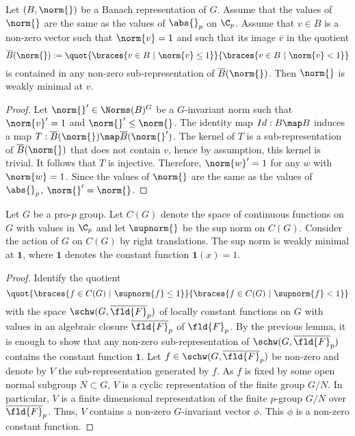 \begin{lem}
Let $(B,\norm{})$ be a Banach representation of $G$.
Assume that the values of $\norm{}$ are the same as the values of $\abs{}_p$ on $\C_p$.
Assume that $v\in B$ is a non-zero vector such that $\norm{v}=1$ and such that its image $\overline{v}$ in the quotient 
\[\overline{B}(\norm{}):=\quot{\braces{v\in B\ |\ \norm{v}\leq 1}}{\braces{v\in B\ |\ \norm{v}< 1}}\]
is contained in any non-zero sub-representation of $\overline{B}(\norm{})$.
Then $\norm{}$ is weakly minimal at $v$.
\end{lem} 
	\begin{proof}
    Let $\norm{}'\in \Norms(B)^G$ be a $G$-invariant norm such that $\norm{v}'=1$ and $\norm{}'\leq \norm{}$.
    The identity map $Id:B\map B$ induces a map $T:\overline{B}(\norm{})\map \overline{B}(\norm{}')$.
    The kernel of $T$ is a sub-representation of $\overline{B}(\norm{})$ that does not contain $v$, hence by assumption, this kernel is trivial.
    It follows that $T$ is injective.
    Therefore, $\norm{w}'=1$ for any $w$ with $\norm{w}=1$.
    Since the values of $\norm{}$ are the same as the values of $\abs{}_p$, $\norm{}'=\norm{}$.
    \end{proof} 
    
\begin{prop}\label{prop_weak_minimality}
Let $G$ be a pro-$p$ group.
Let $C(G)$ denote the space of continuous functions on $G$ with values in $\C_p$ and let $\supnorm{}$ be the sup norm on $C(G)$. 
Consider the action of $G$ on $C(G)$ by right translations.
The sup norm is weakly minimal at $\textbf{1}$, where $\textbf{1}$ denotes the constant function $\textbf{1}(x)=1$.
\end{prop} 
    \begin{proof}
    Identify the quotient
    \[\quot{\braces{f\in C(G)\ |\ \supnorm{f}\leq 1}}{\braces{f\in C(G)\ |\ \supnorm{f}< 1}}\]
    with the space $\schw(G,\overline{\fld{F}}_p)$ of locally constant functions on $G$ with values in an algebraic closure $\overline{\fld{F}}_p$ of $\fld{F}_p$.
    By the previous lemma, it is enough to show that any non-zero sub-representation of $\schw(G,\overline{\fld{F}}_p)$ contains the constant function $\textbf{1}$.
    Let $f\in \schw(G,\overline{\fld{F}}_p)$ be non-zero and denote by $V$ the sub-representation generated by $f$.
    As $f$ is fixed by some open normal subgroup $N\subset G$, $V$ is a cyclic representation of the finite group $G/N$.
    In particular, $V$ is a finite dimensional representation of the finite $p$-group $G/N$ over $\overline{\fld{F}}_p$.
    Thus, $V$ contains a non-zero $G$-invariant vector $\phi$.
    This $\phi$ is a non-zero constant function.
    \end{proof} 
